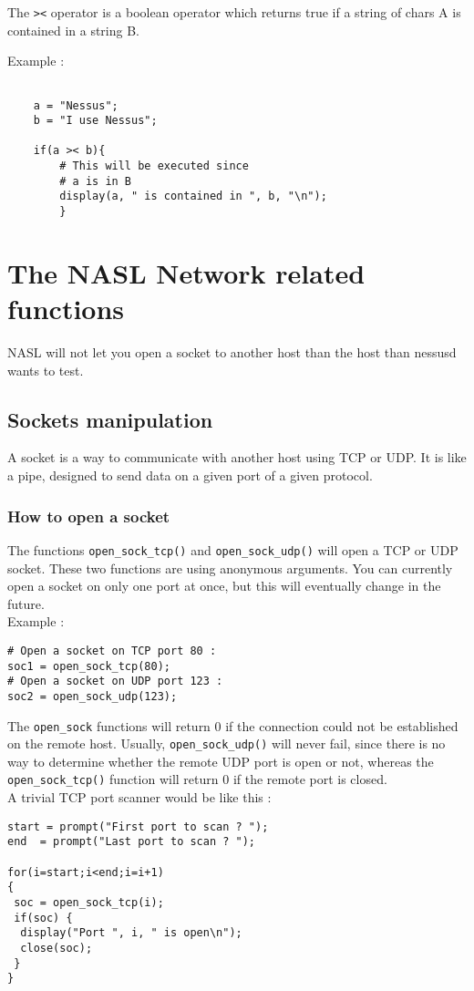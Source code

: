 \documentclass{article}
\begin{document}
The \verb+><+ operator is a boolean operator which returns
true if a string of chars A is contained in a string B.

\noindent Example :

\begin{verbatim}

	a = "Nessus";
	b = "I use Nessus";
	
	if(a >< b){
		# This will be executed since
		# a is in B
		display(a, " is contained in ", b, "\n");
		}
\end{verbatim}
	
\newpage
\section{The NASL Network related functions}


NASL will not let you open a socket to another host
than the host than nessusd wants to test. 

\subsection{Sockets manipulation}

A socket is a way to communicate with another host using TCP or
UDP. It is like a pipe, designed to send data on a given port
of a given protocol.

\subsubsection{How to open a socket}
The functions \verb+open_sock_tcp()+ and \verb+open_sock_udp()+ will
open a TCP or UDP socket. These two functions are using anonymous
arguments. You can currently open a socket on only one port at once,
but this will eventually change in the future.\\
\noindent Example :
\begin{verbatim}
# Open a socket on TCP port 80 :
soc1 = open_sock_tcp(80);
# Open a socket on UDP port 123 :
soc2 = open_sock_udp(123);
\end{verbatim}

The \verb+open_sock+ functions will return 0 if the connection could not
be established on the remote host. Usually, \verb+open_sock_udp()+ will
never fail, since there is no way to determine whether the remote
UDP port is open or not, whereas the \verb+open_sock_tcp()+ function
will return 0 if the remote port is closed.\\
A trivial TCP port scanner would be like this :
\begin{verbatim}
start = prompt("First port to scan ? ");
end  = prompt("Last port to scan ? ");

for(i=start;i<end;i=i+1)
{
 soc = open_sock_tcp(i);
 if(soc) {
  display("Port ", i, " is open\n");
  close(soc);
 }
}
\end{verbatim}
\end{document}
